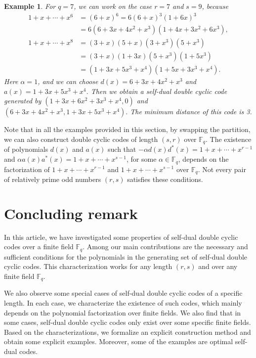 \documentclass[12pt]{article}
\newtheorem{example}[theorem]{Example}
\begin{document}
	\begin{example}\label{ex7coprime}
		For $q=7$, we can work on the case $r=7$ and $s=9$, because
		\begin{align*}
			1+x+\cdots+x^6&=(6+x)^6=6(6+x)^3(1+6x)^3\\
			&=6(6+3x+4x^2+x^3)(1+4x+3x^2+6x^3),\\
			1+x+\cdots+x^8&=(3+x)(5+x)(3+x^3)(5+x^3)\\
			&=(3+x)(1+3x)(5+x^3) (1+5x^3) \\
			&= (1+3x+5x^3+x^4)(1+5x+3x^3+x^4).
		\end{align*}
		Here $\alpha=1$, and we can choose $d(x)=6+3x+4x^2+x^3$ and $a(x)=1+3x+5x^3+x^4$. Then we obtain a self-dual double cyclic code generated by $(1+3x+6x^2+3x^3+x^4,0)$ and $(6+3x+4x^2+x^3,1+3x+5x^3+x^4).$ The minimum distance of this code is 3.
	\end{example}
	Note that in all the examples provided in this section, by swapping the partition, we can also construct double cyclic codes of length $(s,r)$ over $\mathbb{F}_q$. The existence of polynomials $d(x)$ and $a(x)$ such that $-\alpha d(x)d^{*}(x)=1+x+\cdots+x^{r-1}$ and $\alpha a(x)a^{*}(x)=1+x+\cdots+x^{s-1}$, for some $\alpha\in\mathbb{F}_q$, depends on the factorization of $1+x+\cdots+x^{r-1}$ and $1+x+\cdots+x^{s-1}$ over $\mathbb{F}_q$. Not every pair of relatively prime odd numbers $(r,s)$ satisfies these conditions.
	
	\section{Concluding remark}
	In this article, we have investigated some properties of self-dual double cyclic codes over a finite field $\mathbb{F}_q$. 
	Among our main contributions are the necessary and sufficient conditions for the polynomials in the generating set of self-dual double cyclic codes. This characterization works for any length $(r,s)$ and over any finite field $\mathbb{F}_q$.
	
	We also observe some special cases of self-dual double cyclic codes of a specific length. In each case, we characterize the existence of such codes, which mainly depends on the polynomial factorization over finite fields. We also find that in some cases, self-dual double cyclic codes only exist over some specific finite fields. Based on the characterizations, we formalize an explicit construction method and obtain some explicit examples. Moreover, some of the examples are optimal self-dual codes.
	
\end{document}
